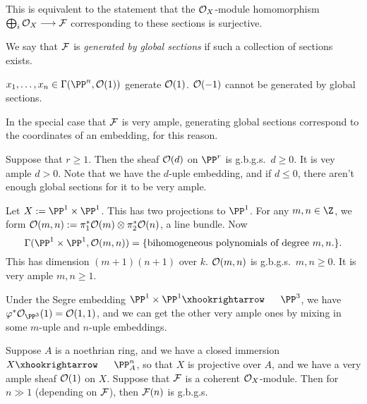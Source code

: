 \documentclass[11pt]{article}
\begin{document}
\begin{Nov3}
\begin{defn*}
This is equivalent to the statement that the  $\mathcal{O}_X$-module homomorphism $\bigoplus_i\mathcal{O}_X\longrightarrow\mathcal{F}$ corresponding to these sections is surjective.

We say that $\mathcal{F}$ is \emph{generated by global sections} if such a collection of sections exists.
\end{defn*}
\begin{exmp*}
$x_1,\ldots,x_n\in\Gamma(\PP^n,\calO(1))$ generate $\mathcal{O}(1)$. $\mathcal{O}(-1)$ cannot be generated by global sections.
\end{exmp*}
\noindent In the special case that $\mathcal{F}$ is very ample, generating global sections correspond to the coordinates of an embedding, for this reason.
\begin{exmp*}
Suppose that $r\geq1$. Then the sheaf $\mathcal{O}(d)$ on $\PP^r$ is g.b.g.s.\ \Iff $d\geq0$. It is vey ample \Iff $d>0$. Note that we have the $d$-uple embedding, and if $d\leq0$, there aren't enough global sections for it to be very ample.
\end{exmp*}
\begin{exmp*}
Let $X:=\PP^1\times\PP^1$. This has two projections to $\PP^1$. For any $m,n\in\Z$, we form $\mathcal{O}(m,n):=\pi_1^*\mathcal{O}(m)\otimes\pi_2^*\mathcal{O}(n)$, a line bundle. Now
\[\Gamma(\PP^1\times\PP^1,\calO(m,n))=\{\text{bihomogeneous polynomials of degree $m,n$.}\}.\]
This has dimension $(m+1)(n+1)$ over $k$.  $\mathcal{O}(m,n)$ is g.b.g.s.\ \Iff $m,n\geq0$. It is very ample \Iff $m,n\geq1$.
\end{exmp*}
\begin{exmp*}
Under the Segre embedding $\PP^1\times\PP^1\cofibration \PP^3$, we have $\phi^*\calO_{\PP^3}(1)=\calO(1,1)$, and we can get the other very ample ones by mixing in some $m$-uple and $n$-uple embeddings.
\end{exmp*}
\begin{thm*}[Serre]
Suppose $A$ is a noethrian ring, and we have a closed immersion $X\cofibration \PP^n_A$, so that $X$ is projective over $A$, and we have a very ample sheaf $\mathcal{O}(1)$ on $X$. Suppose that $\mathcal{F}$ is a coherent $\mathcal{O}_X$-module. Then for $n\gg1$ (depending on $\mathcal{F}$), then $\mathcal{F}(n)$ is g.b.g.s.


\end{thm*}
\end{Nov3}
\end{document}
